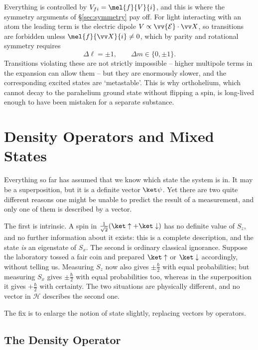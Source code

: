 \begin{remark}
    Everything is controlled by $V_{fi} = \mel{f}{V}{i}$, and this is where the symmetry arguments of \S\ref{sec:symmetry} pay off. For light interacting with an atom the leading term is the electric dipole $V \propto \vv{\mathcal{E}}\cdot\vv X$, so transitions are forbidden unless $\mel{f}{\vv X}{i}\neq0$, which by parity and rotational symmetry requires
    $$
    \Delta \ell = \pm 1, \qquad \Delta m \in \{0, \pm 1\}.
    $$
    Transitions violating these are not strictly impossible -- higher multipole terms in the expansion can allow them -- but they are enormously slower, and the corresponding excited states are `metastable'. This is why orthohelium, which cannot decay to the parahelium ground state without flipping a spin, is long-lived enough to have been mistaken for a separate substance.
\end{remark}

\section{Density Operators and Mixed States}\label{sec:density}

Everything so far has assumed that we know which state the system is in. It may be a superposition, but it is a definite vector $\ket\psi$. Yet there are two quite different reasons one might be unable to predict the result of a measurement, and only one of them is described by a vector.

The first is intrinsic. A spin in $\frac{1}{\sqrt2}(\ket\uparrow + \ket\downarrow)$ has no definite value of $S_z$, and no further information about it exists: this is a complete description, and the state \emph{is} an eigenstate of $S_x$. The second is ordinary classical ignorance. Suppose the laboratory tossed a fair coin and prepared $\ket\uparrow$ or $\ket\downarrow$ accordingly, without telling us. Measuring $S_z$ now also gives $\pm\frac\hbar2$ with equal probabilities; but measuring $S_x$ gives $\pm\frac\hbar2$ with equal probabilities too, whereas in the superposition it gives $+\frac\hbar2$ with certainty. The two situations are physically different, and no vector in $\mathcal{H}$ describes the second one.

The fix is to enlarge the notion of state slightly, replacing vectors by operators.

\subsection{The Density Operator}

